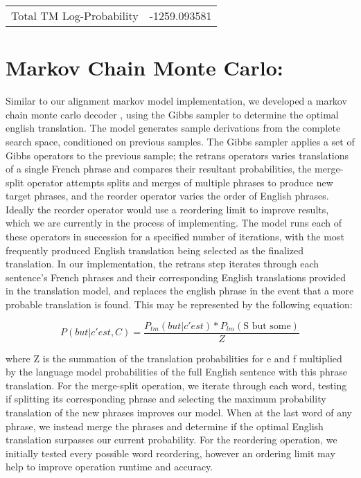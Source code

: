 \documentclass[11pt]{article}
\begin{document}
\begin{center}
\begin{tabular}{l | l}
Total TM Log-Probability & -1259.093581 \\
\end{tabular}
\end{center}
	
\section{\textbf{Markov Chain Monte Carlo:}}

	Similar to our alignment markov model implementation, we developed a markov chain monte carlo decoder , using the Gibbs sampler to determine the optimal english translation. The model generates sample derivations from the complete search space, conditioned on previous samples. The Gibbs sampler applies a set of Gibbs operators to the previous
sample; the retrans operators varies translations of a single French phrase and compares their resultant probabilities, the merge-split operator attempts splits and merges of multiple phrases to produce new target phrases, and the reorder operator varies the order of English phrases. Ideally the reorder operator would use a reordering limit to improve results, which we are currently in the process of implementing. The model runs each of these operators in succession for a specified number of iterations, with the most frequently produced English translation being selected as the finalized translation. In our implementation, the retrans step iterates through each sentence's French phrases and their corresponding English translations provided in the translation model, and replaces the english phrase in the event that a more probable translation is found. This may be represented by the following equation:

$$ P(but | c'est, C) = \frac{P_{tm}(but | c'est) * P_{lm}(\textrm{S but some})}{Z}  $$

where Z is the summation of the translation probabilities for e and f multiplied by the language model probabilities of the full English sentence with this phrase translation. For the merge-split operation, we iterate through each word, testing if splitting its corresponding phrase and selecting the maximum probability translation of the new phrases improves our model. When at the last word of any phrase, we instead merge the phrases and determine if the optimal English translation surpasses our current probability. For the reordering operation, we initially tested every possible word reordering, however an ordering limit may help to improve operation runtime and accuracy.
\end{document}
